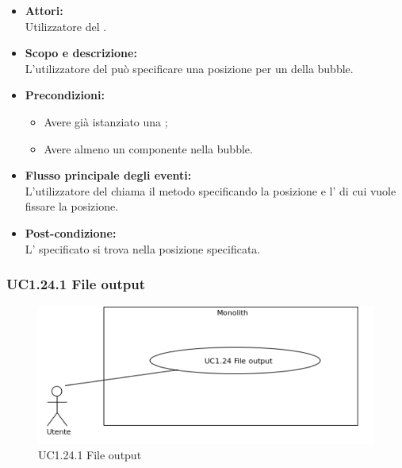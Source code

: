 \begin{itemize}
	\item \textbf{Attori:}
	\\Utilizzatore del .
	\item \textbf{Scopo e descrizione:} 
	\\L’utilizzatore del  può specificare una posizione per un  della bubble.
	\item \textbf{Precondizioni:}
	\begin{itemize}
		\item Avere già istanziato una ;
		\item Avere almeno un componente nella bubble.
	\end{itemize}
	\item \textbf{Flusso principale degli eventi:}
	\\L’utilizzatore del  chiama il metodo specificando la posizione e l’ di cui vuole fissare la posizione.
	\item \textbf{Post-condizione:}
	\\L’ specificato si trova nella posizione specificata.
\end{itemize}

\subsubsection{UC1.24.1 File output} \label{UC1.24.1}

\begin{figure}[H]
	\centering
	\includegraphics[width=15cm]{../../documenti/AnalisiDeiRequisiti/Diagrammi_img/uc1_24.png}
	\caption{UC1.24.1 File output}
\end{figure}

